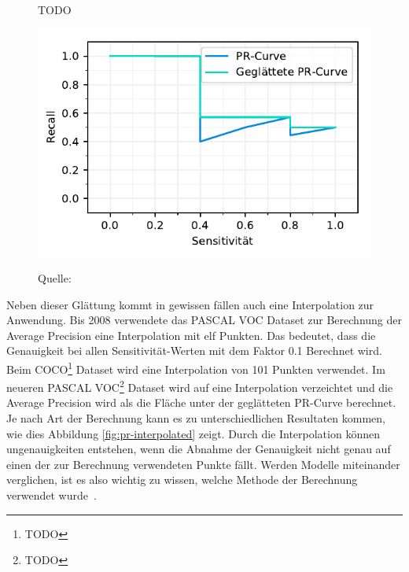 \begin{figure}[h!]
    \captionsetup{width=.9\linewidth}
    \caption{TODO}
    \label{fig:pr-smoothed}
    \centering
    \includegraphics[scale=1]{graphics/matplot/ap__pr-smoothed.pdf}\\
    \caption*{Quelle: \textcite{AP}}
\end{figure}

Neben dieser Glättung kommt in gewissen fällen auch eine Interpolation zur Anwendung. Bis 2008 verwendete das PASCAL VOC Dataset zur Berechnung der Average Precision eine Interpolation mit elf Punkten. Das bedeutet, dass die Genauigkeit bei allen Sensitivität-Werten mit dem Faktor 0.1 Berechnet wird. Beim COCO\footnote{TODO} Dataset wird eine Interpolation von 101 Punkten verwendet. Im neueren PASCAL VOC\footnote{TODO} Dataset wird auf eine Interpolation verzeichtet und die Average Precision wird als die Fläche unter der geglätteten PR-Curve berechnet. Je nach Art der Berechnung kann es zu unterschiedlichen Resultaten kommen, wie dies Abbildung \ref{fig:pr-interpolated} zeigt. Durch die Interpolation können ungenauigkeiten entstehen, wenn die Abnahme der Genauigkeit nicht genau auf einen der zur Berechnung verwendeten Punkte fällt. Werden Modelle miteinander verglichen, ist es also wichtig zu wissen, welche Methode der Berechnung verwendet wurde~\autocite{AP}.

